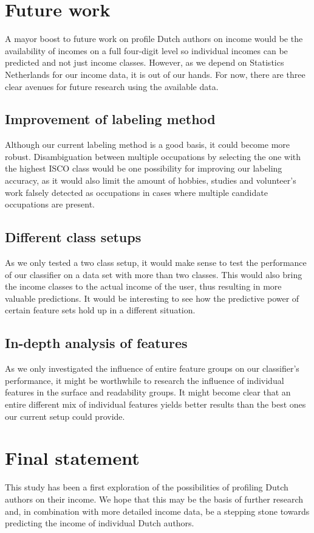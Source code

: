 \documentclass[
10pt, %
a4paper, %
oneside, %
headinclude,footinclude, %
] {book}%
\begin{document}
\section{Future work}
\label{futurework}
A mayor boost to future work on profile Dutch authors on income would be the availability of incomes on a full four-digit level so individual incomes can be predicted and not just income classes. However, as we depend on Statistics Netherlands for our income data, it is out of our hands. For now, there are three clear avenues for future research using the available data.

\subsection{Improvement of labeling method}
Although our current labeling method is a good basis, it could become more robust. Disambiguation between multiple occupations by selecting the one with the highest ISCO class would be one possibility for improving our labeling accuracy, as it would also limit the amount of hobbies, studies and volunteer's work falsely detected as occupations in cases where multiple candidate occupations are present.

\subsection{Different class setups}
As we only tested a two class setup, it would make sense to test the performance of our classifier on a data set with more than two classes. This would also bring the income classes to the actual income of the user, thus resulting in more valuable predictions. It would be interesting to see how the predictive power of certain feature sets hold up in a different situation.

\subsection{In-depth analysis of features}
As we only investigated the influence of entire feature groups on our classifier's performance, it might be worthwhile to research the influence of individual features in the surface and readability groups. It might become clear that an entire different mix of individual features yields better results than the best ones our current setup could provide.

\section{Final statement}
This study has been a first exploration of the possibilities of profiling Dutch authors on their income. We hope that this may be the basis of further research and, in combination with more detailed income data, be a stepping stone towards predicting the income of individual Dutch authors. 
\end{document}
